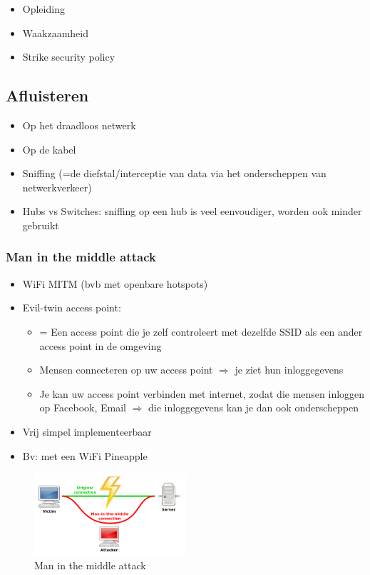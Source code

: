 \documentclass{article}
\begin{document}
\begin{itemize}
    \item Opleiding
    \item Waakzaamheid
    \item Strike security policy
\end{itemize}

\subsection{Afluisteren}

\begin{itemize}
    \item Op het draadloos netwerk
    \item Op de kabel
    \item Sniffing (=de diefstal/interceptie van data via het onderscheppen van netwerkverkeer)
    \item Hubs vs Switches: sniffing op een hub is veel eenvoudiger, worden ook minder gebruikt
\end{itemize}



\subsubsection{Man in the middle attack}

\begin{itemize}
    \item WiFi MITM (bvb met openbare hotspots)
    \item Evil-twin access point: 
    \begin{itemize}
        \item = Een access point die je zelf controleert met dezelfde SSID als een ander access point in de omgeving
        \item Mensen connecteren op uw access point $\Rightarrow$ je ziet hun inloggegevens 
        \item Je kan uw access point verbinden met internet, zodat die mensen inloggen op Facebook, Email $\Rightarrow$ die inloggegevens kan je dan ook onderscheppen
    \end{itemize} 
    \item Vrij simpel implementeerbaar
    \item Bv: met een WiFi Pineapple
\end{itemize}

\begin{figure}[H]
    \centering
    \includegraphics[width=0.5\textwidth]{mitm-attack.png}
    \caption{Man in the middle attack}
\end{figure}
\end{document}
